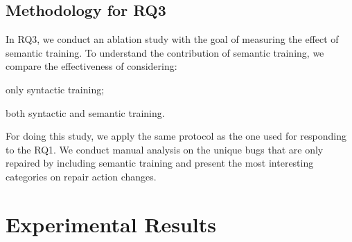 \subsection{Methodology for RQ3}
In RQ3, we conduct an ablation study with the goal of measuring the effect of semantic training.
To understand the contribution of semantic training, we compare the effectiveness of  \approach considering:
\begin{inparaenum}[\it 1)]
\item only syntactic training; 
\item both syntactic and semantic training.
\end{inparaenum}
For doing this study, we apply the same protocol as the one used for responding to the RQ1.
We conduct manual analysis on the unique bugs that are only repaired by including semantic training and present the most interesting categories on repair action changes.

\section{Experimental Results}

